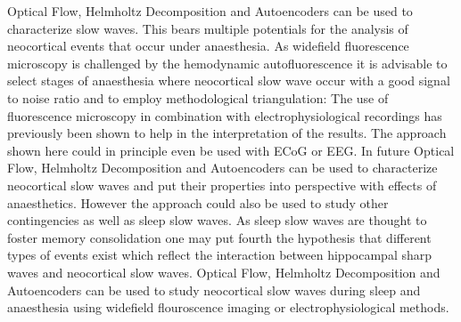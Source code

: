 Optical Flow, Helmholtz Decomposition and Autoencoders can be used to characterize slow waves. This bears multiple potentials for the analysis of neocortical events that occur under anaesthesia. As widefield fluorescence microscopy is challenged by the hemodynamic autofluorescence it is advisable to select stages of anaesthesia where neocortical slow wave occur with a good signal to noise ratio and to employ methodological triangulation: The use of fluorescence microscopy in combination with electrophysiological recordings has previously been shown to help in the interpretation of the results. The approach shown here could in principle even be used with ECoG or EEG. In future Optical Flow, Helmholtz Decomposition and Autoencoders can be used to characterize neocortical slow waves and put their properties into perspective with effects of anaesthetics. However the approach could also be used to study other contingencies as well as sleep slow waves. As sleep slow waves are thought to foster memory consolidation one may put fourth the hypothesis that different types of events exist which reflect the interaction between hippocampal sharp waves and neocortical slow waves. Optical Flow, Helmholtz Decomposition and Autoencoders can be used to study neocortical slow waves during sleep and anaesthesia using widefield flouroscence imaging or electrophysiological methods.
